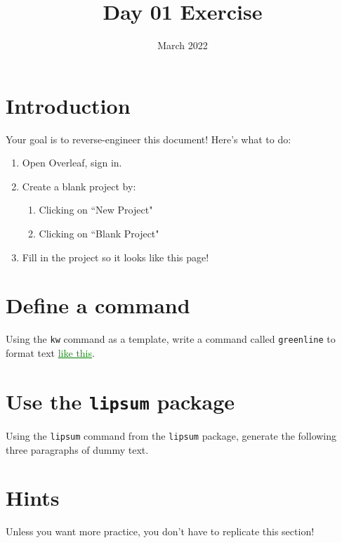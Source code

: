 \documentclass[twocolumn]{article}
\title{Day 01 Exercise}
\date{March 2022}
\newcommand\greenline[1]{\textcolor{green}{\underline{#1}}}
\begin{document}
\maketitle

\section{Introduction} \label{sec:intro}

Your goal is to reverse-engineer this document! Here's what to do:

\begin{enumerate}
    \item Open Overleaf, sign in.
    \item Create a blank project by:
    \begin{enumerate}
        \item Clicking on ``New Project" 
        \item Clicking on ``Blank Project"
    \end{enumerate}
    \item Fill in the project so it looks like this page!
\end{enumerate}

\section{Define a command} \label{sec:command}

Using the \texttt{kw} command as a template, write a command called \texttt{greenline} to format text \greenline{like this}.

\section{Use the \texttt{lipsum} package} \label{sec:package}

Using the \texttt{lipsum} command from the \texttt{lipsum} package, generate the following three paragraphs of dummy text.

\lipsum[1-3]

\section{Hints}

Unless you want more practice, you don't have to replicate this section!
\end{document}
